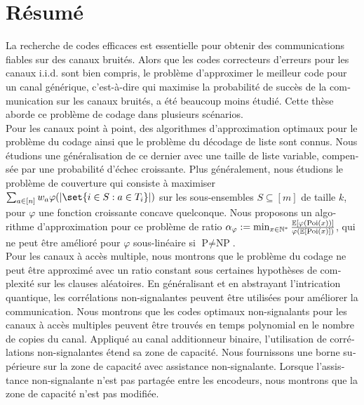 \chapter*{Résumé}

\begin{otherlanguage}{french}
  La recherche de codes efficaces est essentielle pour obtenir des communications fiables sur des canaux bruités. Alors que les codes correcteurs d'erreurs pour les canaux i.i.d. sont bien compris, le problème d'approximer le meilleur code pour un canal générique, c'est-à-dire qui maximise la probabilité de succès de la communication sur les canaux bruités, a été beaucoup moins étudié. Cette thèse aborde ce problème de codage dans plusieurs scénarios.\vspace{2mm}\\
  Pour les canaux point à point, des algorithmes d'approximation optimaux pour le problème du codage ainsi que le problème du décodage de liste sont connus. Nous étudions une généralisation de ce dernier avec une taille de liste variable, compensée par une probabilité d'échec croissante. Plus généralement, nous étudions le problème de couverture qui consiste à maximiser $\sum_{a \in [n]} w_a \varphi(\abs{\set{i \in S : a \in T_i}})$ sur les sous-ensembles $S \subseteq [m]$ de taille $k$, pour $\varphi$ une fonction croissante concave quelconque. Nous proposons un algorithme d'approximation pour ce problème de ratio $\alpha_{\varphi} := \min_{x \in \mathbb{N}^*} \frac{\mathbb{E}[\varphi(\operatorname{\text{Poi}}(x))]}{\varphi(\mathbb{E}[\operatorname{\text{Poi}}(x)])}$, qui ne peut être amélioré pour $\varphi$ sous-linéaire si $\textrm{P}\not=\textrm{NP}$.\vspace{2mm}\\
  Pour les canaux à accès multiple, nous montrons que le problème du codage ne peut être approximé avec un ratio constant sous certaines hypothèses de complexité sur les clauses aléatoires. En généralisant et en abstrayant l'intrication quantique, les corrélations non-signalantes peuvent être utilisées pour améliorer la communication. Nous montrons que les codes optimaux non-signalants pour les canaux à accès multiples peuvent être trouvés en temps polynomial en le nombre de copies du canal. Appliqué au canal additionneur binaire, l'utilisation de corrélations non-signalantes étend sa zone de capacité. Nous fournissons une borne supérieure sur la zone de capacité avec assistance non-signalante. Lorsque l'assistance non-signalante n'est pas partagée entre les encodeurs, nous montrons que la zone de capacité n'est pas modifiée.\vspace{2mm}\\

\end{otherlanguage}
